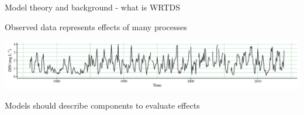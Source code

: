 \documentclass[xcolor=dvipsnames,serif]{beamer}\usepackage[]{graphicx}\usepackage[]{color}
\begin{document}
\begin{frame}[t]{Model theory and background - what is WRTDS}
\onslide<+->
{\bf \centerline{Observed data represents effects of many processes}}
\vspace{0.15in}
\centerline{\includegraphics[width = \textwidth]{imgs/ts_ex.pdf}}
\centerline{Models should describe components to evaluate effects}
\vspace{-0.1in}
\begin{columns}[t]
\begin{column}{0.5\textwidth}
\end{column}
\begin{column}{0.5\textwidth}
\end{column}
\end{columns}
\end{frame}
\end{document}
